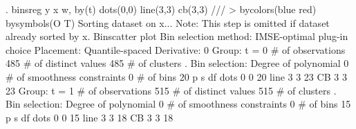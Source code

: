. binsreg y x w, by(t) dots(0,0) line(3,3) cb(3,3) ///
>                bycolors(blue red) bysymbols(O T) 
Sorting dataset on x...
Note: This step is omitted if dataset already sorted by x.
{\smallskip}
Binscatter plot
Bin selection method: IMSE-optimal plug-in choice
Placement: Quantile-spaced
Derivative: 0
{\smallskip}
Group: t = 0
\# of observations             {\VBAR}     485
\# of distinct values          {\VBAR}     485
\# of clusters                 {\VBAR}       .
Bin selection:                {\VBAR} 
         Degree of polynomial {\VBAR}       0
  \# of smoothness constraints {\VBAR}       0
                    \# of bins {\VBAR}      20
{\smallskip}
         {\VBAR}      p       s       df
 dots    {\VBAR}      0       0       20
 line    {\VBAR}      3       3       23
 CB      {\VBAR}      3       3       23
{\smallskip}
{\smallskip}
Group: t = 1
\# of observations             {\VBAR}     515
\# of distinct values          {\VBAR}     515
\# of clusters                 {\VBAR}       .
Bin selection:                {\VBAR} 
         Degree of polynomial {\VBAR}       0
  \# of smoothness constraints {\VBAR}       0
                    \# of bins {\VBAR}      15
{\smallskip}
         {\VBAR}      p       s       df
 dots    {\VBAR}      0       0       15
 line    {\VBAR}      3       3       18
 CB      {\VBAR}      3       3       18
